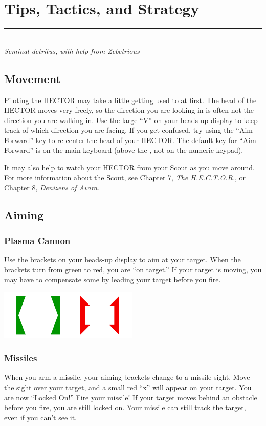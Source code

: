 \documentclass{article}
\let\oldsection\section
\renewcommand\section{\clearpage\oldsection}
\begin{document}
\section{Tips, Tactics, and Strategy}
\rule{5.5cm}{.15pt}\\
\rmfamily\textit{Seminal detritus, with help from Zebetrious}

\subsection{Movement}
Piloting the HECTOR may take a little getting used to at first. The head of the HECTOR moves very freely, so the direction you are looking in is often not the direction you are walking in. Use the large ``V'' on your heads-up display to keep track of which direction you are facing. If you get confused, try using the ``Aim Forward'' key to re-center the head of your HECTOR. The default key for ``Aim Forward'' is \textbf{} on the main keyboard (above the \textbf{}, not on the numeric keypad).

It may also help to watch your HECTOR from your Scout as you move around. For more information about the Scout, see Chapter 7, \textit{The H.E.C.T.O.R.}, or Chapter 8, \textit{Denizens of Avara}.

\subsection{Aiming}
\subsubsection{Plasma Cannon}
Use the brackets on your heads-up display to aim at your target. When the brackets turn from green to red, you are ``on target.'' If your target is moving, you may have to compensate some by leading your target before you fire.

\begin{center}
	\includegraphics{img/24.pdf}\\
\end{center}

\subsubsection{Missiles}
When you arm a missile, your aiming brackets change to a missile sight. Move the sight over your target, and a small red ``x'' will appear on your target. You are now ``Locked On!'' Fire your missile! If your target moves behind an obstacle before you fire, you are still locked on. Your missile can still track the target, even if you can't see it.
\end{document}
